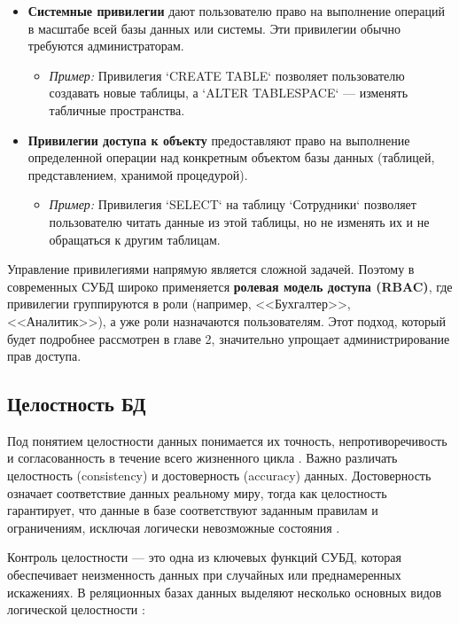 \begin{itemize}
    \item \textbf{Системные привилегии} дают пользователю право на выполнение операций в масштабе всей базы данных или системы. Эти привилегии обычно требуются администраторам.
    \begin{itemize}
        \item \textit{Пример:} Привилегия `CREATE TABLE` позволяет пользователю создавать новые таблицы, а `ALTER TABLESPACE` — изменять табличные пространства.
    \end{itemize}

    \item \textbf{Привилегии доступа к объекту} предоставляют право на выполнение определенной операции над конкретным объектом базы данных (таблицей, представлением, хранимой процедурой).
    \begin{itemize}
        \item \textit{Пример:} Привилегия `SELECT` на таблицу `Сотрудники` позволяет пользователю читать данные из этой таблицы, но не изменять их и не обращаться к другим таблицам.
    \end{itemize}
\end{itemize}

Управление привилегиями напрямую является сложной задачей. Поэтому в современных СУБД широко применяется \textbf{ролевая модель доступа (RBAC)}, где привилегии группируются в роли (например, <<Бухгалтер>>, <<Аналитик>>), а уже роли назначаются пользователям. Этот подход, который будет подробнее рассмотрен в главе 2, значительно упрощает администрирование прав доступа.

\subsection{Целостность БД}\label{sec:concept_integrity_db}
Под понятием целостности данных понимается их точность, непротиворечивость и согласованность в течение всего жизненного цикла \autocite[с. 18]{Skakun}. Важно различать целостность (consistency) и достоверность (accuracy) данных. Достоверность означает соответствие данных реальному миру, тогда как целостность гарантирует, что данные в базе соответствуют заданным правилам и ограничениям, исключая логически невозможные состояния \autocite{ElmasriNavathe}.

Контроль целостности — это одна из ключевых функций СУБД, которая обеспечивает неизменность данных при случайных или преднамеренных искажениях. В реляционных базах данных выделяют несколько основных видов логической целостности \autocite{Silberschatz}:

